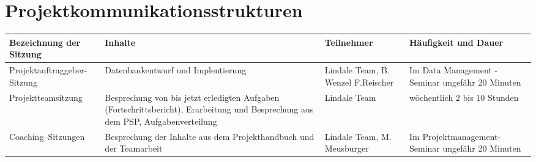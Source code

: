 \section{Projektkommunikationsstrukturen}
\tabulinesep=1.3mm
\begin{longtabu} to 14cm {|X[l]|X[l]|X[l]|X[l]|}
\hline
\parbox{3cm}{Bezeichnung der Sitzung} & \parbox{3cm}{Inhalte} & \parbox{3cm}{Teilnehmer} & \parbox{3cm}{Häufigkeit und Dauer} \\
\hline
\parbox{3cm}{Projektauftraggeber-Sitzung} & \parbox{3cm}{Datenbankentwurf und Implentierung} & \parbox{3cm}{Lindale Team, B. Wenzel F.Reischer} & \parbox{3cm}{Im Data Management - Seminar ungefähr 20 Minuten} \\
\hline
\parbox{3cm}{Projektteamsitzung} & \parbox{3cm}{Besprechung von bis jetzt erledigten Aufgaben (Fortschrittsbericht), Erarbeitung und Besprechung aus dem PSP, Aufgabenverteilung} & \parbox{3cm}{Lindale Team} & \parbox{3cm}{wöchentlich 2 bis 10 Stunden} \\
\hline
\parbox{3cm}{Coaching–Sitzungen} & \parbox{3cm}{Besprechung der Inhalte aus dem Projekthandbuch und der Teamarbeit} & \parbox{3cm}{Lindale Team, M. Meusburger} & \parbox{3cm}{Im Projektmanagement-Seminar ungefähr 20 Minuten} \\
\hline
\end{longtabu}